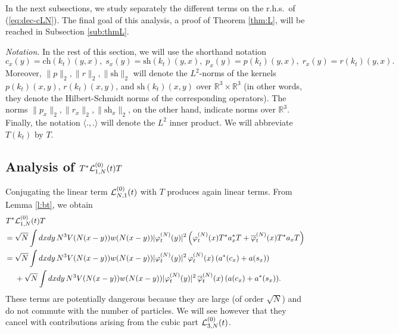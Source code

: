 \documentclass[11pt,a4paper]{article}
\newcommand{\bR}{{\mathbb R}}
\newcommand{\cL}{{\cal L}}
\begin{document}
In the next subsections, we study separately the different terms on the r.h.s.\ of (\ref{eq:dec-cLN}). The final goal of this analysis, a proof of Theorem \ref{thm:L}, will be reached in Subsection \ref{sub:thmL}.

\medskip

{\it Notation.} In the rest of this section, we will use the shorthand notation \begin{equation}\label{eq:def-csprx} 
c_x (y) = \text{ch} (k_t) (y,x), \;  s_x (y) = \text{sh} (k_t) (y,x), \; p_x (y) = p (k_t) (y,x), \; 
r_x (y) = r (k_t) (y,x). \end{equation}
Moreover, $\| p \|_2 , \| r \|_2, \|\text{sh} \|_2$ will denote the $L^2$-norms of the kernels $p (k_t) (x,y)$, $r (k_t) (x,y)$, and $\text{sh} (k_t) (x,y)$ over $\bR^3 \times \bR^3$ (in other words, they denote the Hilbert-Schmidt norms of the corresponding operators). The norms $\| p_x \|_2, \| r_x \|_2, \| \text{sh}_x \|_2$, on the other hand, indicate norms over $\bR^3$. Finally, the notation $\langle . , . \rangle$ will denote the $L^2$ inner product. We will abbreviate $T(k_t)$ by $T$.


\subsection{Analysis of $T^* \cL^{(0)}_{1,N} (t) T$}

Conjugating the linear term $\cL^{(0)}_{N,1} (t)$ with $T$ produces again linear terms. {F}rom Lemma \ref{l:bt}, we obtain
\begin{equation}\label{eq:TL1T} \begin{split} T^* & \cL^{(0)}_{1,N} (t) T \\ = \; & \sqrt{N} \int dx dy \, N^3 V (N (x-y)) w (N (x-y)) |\varphi_t^{(N)} (y)|^2 \left( \varphi^{(N)}_t (x) T^* a^*_x T + \overline{\varphi}_t^{(N)} (x) T^* a_x T \right) \\ 
= \; &\sqrt{N} \int dx dy \, N^3 V (N (x-y)) w (N (x-y)) |\varphi_t^{(N)} (y)|^2 \, \varphi^{(N)}_t (x)  \, ( a^*(c_x) + a(s_x)) \\ &+ \sqrt{N} \int dx dy \, N^3 V (N (x-y)) w (N (x-y)) |\varphi_t^{(N)} (y)|^2 \, \overline{\varphi}^{(N)}_t (x)  \, ( a (c_x) + a^* (s_x)). \end{split} \end{equation}
These terms are potentially dangerous because they are large (of order $\sqrt{N}$) and do not commute with the number of particles. We will see however that they cancel with contributions arising from the cubic part $\cL_{3,N}^{(0)} (t)$. 
\end{document}
